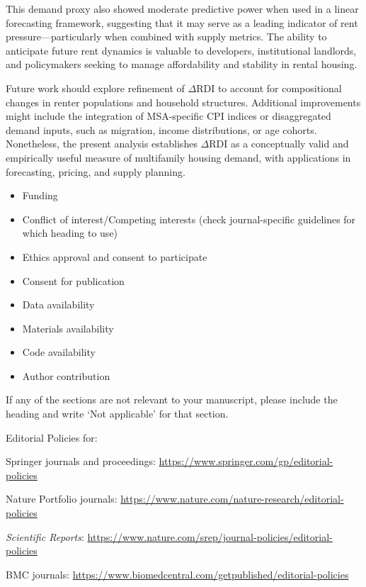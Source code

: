 \documentclass[sn-mathphys-num]{sn-jnl}%
\begin{document}
This demand proxy also showed moderate predictive power when used in a linear forecasting framework, suggesting that it may serve as a leading indicator of rent pressure---particularly when combined with supply metrics. The ability to anticipate future rent dynamics is valuable to developers, institutional landlords, and policymakers seeking to manage affordability and stability in rental housing.

Future work should explore refinement of \(\Delta\text{RDI}\) to account for compositional changes in renter populations and household structures. Additional improvements might include the integration of MSA-specific CPI indices or disaggregated demand inputs, such as migration, income distributions, or age cohorts. Nonetheless, the present analysis establishes \(\Delta\text{RDI}\) as a conceptually valid and empirically useful measure of multifamily housing demand, with applications in forecasting, pricing, and supply planning.





\begin{itemize}
    \item Funding
    \item Conflict of interest/Competing interests (check journal-specific guidelines for which heading to use)
    \item Ethics approval and consent to participate
    \item Consent for publication
    \item Data availability
    \item Materials availability
    \item Code availability
    \item Author contribution
\end{itemize}

\noindent
If any of the sections are not relevant to your manuscript, please include the heading and write `Not applicable' for that section.

\bigskip
\begin{flushleft}%
    Editorial Policies for:

    \bigskip\noindent
    Springer journals and proceedings: \url{https://www.springer.com/gp/editorial-policies}

    \bigskip\noindent
    Nature Portfolio journals: \url{https://www.nature.com/nature-research/editorial-policies}

    \bigskip\noindent
    \textit{Scientific Reports}: \url{https://www.nature.com/srep/journal-policies/editorial-policies}

    \bigskip\noindent
    BMC journals: \url{https://www.biomedcentral.com/getpublished/editorial-policies}
\end{flushleft}
\end{document}
